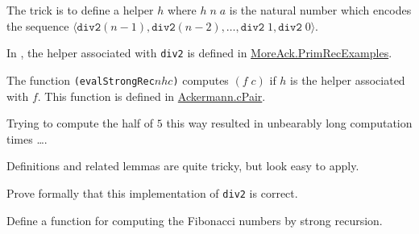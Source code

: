   The trick is to define a helper $h$ where
  $h\;n\;a$ is the natural number which encodes
  the sequence $\langle \texttt{div2}(n-1),
  \texttt{div2}(n-2),\dots,\texttt{div2}\;1, \texttt{div2}\;0\rangle$.

  In \coq, the helper associated with \texttt{div2} is defined in
  \href{../theories/html/hydras.MoreAck/PrimRecExamples}{MoreAck.PrimRecExamples}.
  

  
  
  The function \texttt{(evalStrongRec\;$n$\;$h$\;$c$)} computes
  $(f\;c)$ if $h$ is the helper associated with $f$.
  This function is defined in
  \href{../theories/html/hydras.Ackermann.cPair.html}{Ackermann.cPair}.


  Trying to compute the half of $5$ this way resulted in unbearably long computation times \dots.
  

  
  
   Definitions and related lemmas are quite tricky, but look easy to apply. 


  
    \begin{exercise}
      Prove formally that this implementation of \texttt{div2} is correct.
    \end{exercise}


    \begin{exercise}
     Define a function for computing the Fibonacci numbers by strong recursion.
    \end{exercise}

       
